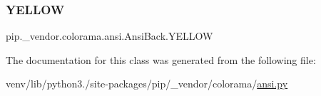 \subsubsection{\texorpdfstring{Y\+E\+L\+L\+OW}{YELLOW}}
{\footnotesize\ttfamily pip.\+\_\+vendor.\+colorama.\+ansi.\+Ansi\+Back.\+Y\+E\+L\+L\+OW\hspace{0.3cm}{\ttfamily [static]}}



The documentation for this class was generated from the following file\+:\begin{DoxyCompactItemize}
\item 
venv/lib/python3./site-\/packages/pip/\+\_\+vendor/colorama/\hyperlink{ansi_8py}{ansi.\+py}\end{DoxyCompactItemize}
